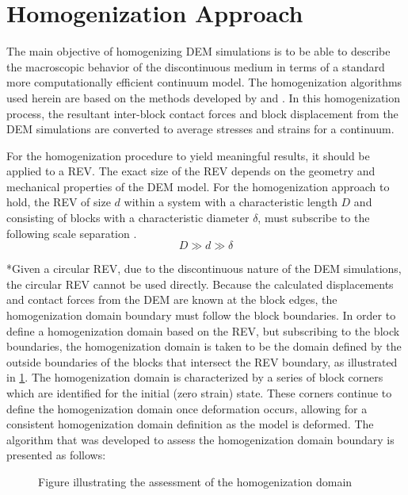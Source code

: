 \section{Homogenization Approach}

The main objective of homogenizing DEM simulations is to be able to
describe the macroscopic behavior of the discontinuous medium in terms
of a standard more computationally efficient continuum model. The
homogenization algorithms used herein are based on the methods developed
by \citet{daddetta_particle_2004} and \citet{wellmann_homogenization_2008}. In this
homogenization process, the resultant inter-block contact forces and
block displacement from the DEM simulations are converted to average
stresses and strains for a continuum.

For the homogenization procedure to yield meaningful results, it should
be applied to a REV. The exact size of the REV depends on the geometry
and mechanical properties of the DEM model. For the homogenization
approach to hold, the REV of size $d$ within a system with a characteristic
length $D$ and consisting of blocks with a characteristic diameter
$\delta$, must subscribe to the following scale separation \cite{wellmann_homogenization_2008}. 
\begin{equation}
D\gg d\gg\delta\label{eqn:hom1a}
\end{equation}



{*}Given a circular REV, due to the discontinuous nature of the DEM
simulations, the circular REV cannot be used directly. Because the
calculated displacements and contact forces from the DEM are known
at the block edges, the homogenization domain boundary must follow
the block boundaries. In order to define a homogenization domain based
on the REV, but subscribing to the block boundaries, the homogenization
domain is taken to be the domain defined by the outside boundaries
of the blocks that intersect the REV boundary, as illustrated in \ref{fig:vorDFN}.
The homogenization domain is characterized by a series of block corners
which are identified for the initial (zero strain) state. These corners
continue to define the homogenization domain once deformation occurs,
allowing for a consistent homogenization domain definition as the
model is deformed. The algorithm that was developed to assess the
homogenization domain boundary is presented as follows: 
\begin{figure}
\label{fig:vorDFN} \caption{Figure illustrating the assessment of the homogenization domain}
\end{figure}

